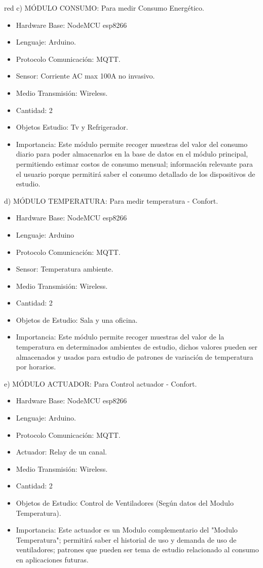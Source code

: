 \documentclass[11pt]{charter}
\begin{document}
\begin{consigna}{red}
c) MÓDULO CONSUMO: Para medir Consumo Energético.
\begin{itemize}
\item Hardware Base: NodeMCU esp8266
\item Lenguaje: Arduino.
\item Protocolo Comunicación: MQTT.
\item Sensor: Corriente AC max 100A no invasivo.
\item Medio Transmisión: Wireless.
\item Cantidad: 2
\item Objetos Estudio: Tv y Refrigerador.
\item Importancia: Este módulo permite recoger muestras del valor del consumo diario para poder almacenarlos en la base de datos en el módulo principal, permitiendo estimar costos de consumo mensual; información relevante para el usuario porque permitirá saber el consumo detallado de los dispositivos de estudio.
\end{itemize}

d) MÓDULO TEMPERATURA: Para medir temperatura - Confort.
\begin{itemize}
\item Hardware Base: NodeMCU esp8266
\item Lenguaje: Arduino
\item Protocolo Comunicación: MQTT.
\item Sensor: Temperatura ambiente.
\item Medio Transmisión: Wireless.
\item Cantidad: 2
\item Objetos de Estudio: Sala y una oficina.
\item Importancia: Este módulo permite recoger muestras del valor de la temperatura en determinados ambientes de estudio, dichos valores pueden ser almacenados y usados para estudio de patrones de variación de temperatura por horarios.
\end{itemize}

e) MÓDULO ACTUADOR: Para Control actuador - Confort.
\begin{itemize}
\item Hardware Base: NodeMCU esp8266
\item Lenguaje: Arduino.
\item Protocolo Comunicación: MQTT.
\item Actuador: Relay de un canal.
\item Medio Transmisión: Wireless.
\item Cantidad: 2
\item Objetos de Estudio: Control de Ventiladores (Según datos del Modulo Temperatura).
\item Importancia: Este actuador es un Modulo complementario del "Modulo Temperatura"; permitirá saber el historial de uso y demanda de uso de ventiladores; patrones que pueden ser tema de estudio relacionado al consumo en aplicaciones futuras.
\end{itemize}


\end{consigna}
\end{document}
